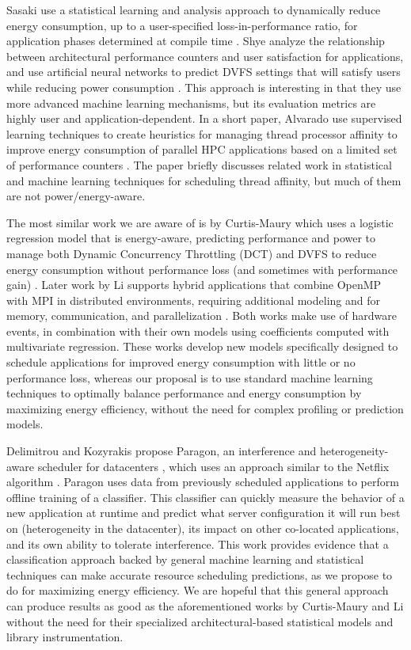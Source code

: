 Sasaki \etal use a statistical learning and analysis approach to dynamically reduce energy consumption, up to a user-specified loss-in-performance ratio, for application phases determined at compile time \cite{Sasaki}.
Shye \etal analyze the relationship between architectural performance counters and user satisfaction for applications, and use artificial neural networks to predict DVFS settings that will satisfy users while reducing power consumption \cite{ShyeIDVFS}.
This approach is interesting in that they use more advanced machine learning mechanisms, but its evaluation metrics are highly user and application-dependent.
In a short paper, Alvarado \etal use supervised learning techniques to create heuristics for managing thread processor affinity to improve energy consumption of parallel HPC applications based on a limited set of performance counters \cite{Alvarado}.
The paper briefly discusses related work in statistical and machine learning techniques for scheduling thread affinity, but much of them are not power/energy-aware.

The most similar work we are aware of is by Curtis-Maury \etal which uses a logistic regression model that is energy-aware, predicting performance and power to manage both Dynamic Concurrency Throttling (DCT) and DVFS to reduce energy consumption without performance loss (and sometimes with performance gain) \cite{Curtis-Maury2008}.
Later work by Li \etal supports hybrid applications that combine OpenMP with MPI in distributed environments, requiring additional modeling and for memory, communication, and parallelization \cite{LiIPDPS2010}.
Both works make use of hardware events, in combination with their own models using coefficients computed with multivariate regression.
These works develop new models specifically designed to schedule applications for improved energy consumption with little or no performance loss, whereas our proposal is to use standard machine learning techniques to optimally balance performance and energy consumption by maximizing energy efficiency, without the need for complex profiling or prediction models.

Delimitrou and Kozyrakis propose Paragon, an interference and heterogeneity-aware scheduler for datacenters \cite{Paragon}, which uses an approach similar to the Netflix algorithm \cite{NetflixPrize}.
Paragon uses data from previously scheduled applications to perform offline training of a classifier.
This classifier can quickly measure the behavior of a new application at runtime and predict what server configuration it will run best on (heterogeneity in the datacenter), its impact on other co-located applications, and its own ability to tolerate interference.
This work provides evidence that a classification approach backed by general machine learning and statistical techniques can make accurate resource scheduling predictions, as we propose to do for maximizing energy efficiency.
We are hopeful that this general approach can produce results as good as the aforementioned works by Curtis-Maury \etal and Li \etal without the need for their specialized architectural-based statistical models and library instrumentation.


